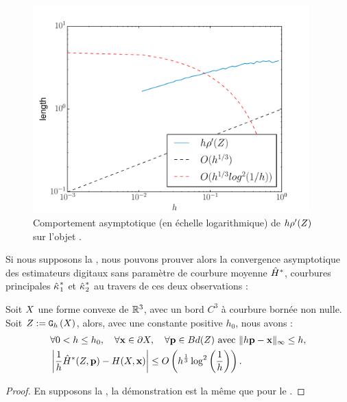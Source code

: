 \begin{figure}[ht]{
  \begin{center}
    \includegraphics[height=8cm]{images/Curvature/Ellipsoid_Radius}
  \end{center}}
    \caption{Comportement asymptotique (en échelle logarithmique) de $h\rho'( Z )$ sur l'objet \Ellipsoid.
    \label{fig:bounds-length-MDSS-fig}}
\end{figure}


Si nous supposons la , nous pouvons prouver
alors la convergence asymptotique des estimateurs digitaux sans paramètre de
courbure moyenne $\hat{H}^{*}$, courbures principales $\hat{\kappa_{}}_{1}^{*}$ et
$\hat{\kappa_{}}_{2}^{*}$ au travers de ces deux observations :
%
\begin{observation}{}
  \label{obs:curvature-estimator-3d-mean-pf-conv}
  Soit $X$ une forme convexe de $\mathbb{R}^3$, avec un bord $C^3$ à
  courbure bornée non nulle. Soit $Z := \mathtt{G}_{h}\left(X\right)$, alors, avec une
  constante positive $h_0$, nous avons :
  \begin{align}
    &\forall 0 < h \le h_0, \quad \forall \mathbf{x} \in \partial X, \quad \forall \mathbf{p} \in Bd({Z}) \text{~avec~} \| h\mathbf{p} -\mathbf{x}\|_\infty \le h, \nonumber\\
    &\left | \frac{1}{h}\hat{H}^{*}(Z,\mathbf{p}) - H(X,\mathbf{x}) \right| \le O\left( h^{\frac{1}{3}} \log^2 \left(\frac{1}{h}\right)\right) .
  \end{align}
\end{observation}
\begin{proof}
  En supposons la , la démonstration est la
  même que pour le .
\end{proof}

